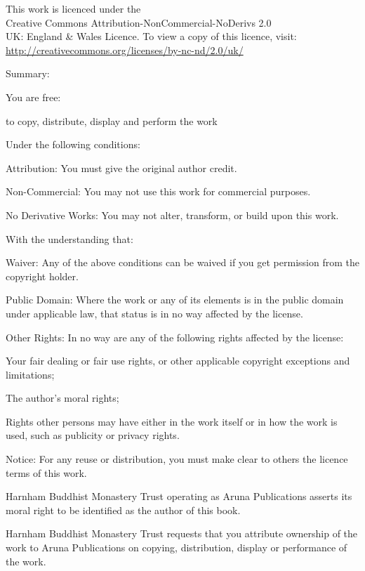 
{\ccdetailssize\setlength{\parindent}{0em}%
\raggedright

\label{cc-details}
{\centering

{\large\ccbyncnd}
\bigskip

This work is licenced under the\\ Creative Commons Attribution-NonCommercial-NoDerivs 2.0\\ UK: England \& Wales Licence. To view a copy of this licence, visit:\\
\href{http://creativecommons.org/licenses/by-nc-nd/2.0/uk/}{http://creativecommons.org/licenses/by-nc-nd/2.0/uk/}

}
\bigskip

Summary:
\bigskip

You are free:

\begin{packeditemize}
\item to copy, distribute, display and perform the work
\end{packeditemize}

Under the following conditions:
\begin{packeditemize}
\item Attribution: You must give the original author credit.
\item Non-Commercial: You may not use this work for commercial purposes.
\item No Derivative Works: You may not alter, transform, or build upon this work.
\end{packeditemize}

With the understanding that:
\begin{packeditemize}
\item Waiver: Any of the above conditions can be waived if you get permission from the copyright holder.
\item Public Domain: Where the work or any of its elements is in the public domain under applicable law, that status is in no way affected by the license.
\item Other Rights: In no way are any of the following rights affected by the license:
\begin{packeditemize}
\item Your fair dealing or fair use rights, or other applicable copyright exceptions and limitations;
\item The author's moral rights;
\item Rights other persons may have either in the work itself or in how the work is used, such as publicity or privacy rights.
\end{packeditemize}
\item Notice: For any reuse or distribution, you must make clear to others the licence terms of this work.
\end{packeditemize}

Harnham Buddhist Monastery Trust operating as Aruna Publications asserts its moral right to be identified as the author of this book.
\bigskip

Harnham Buddhist Monastery Trust requests that you attribute ownership of the work to Aruna Publications on copying, distribution, display or performance of the work.

}
